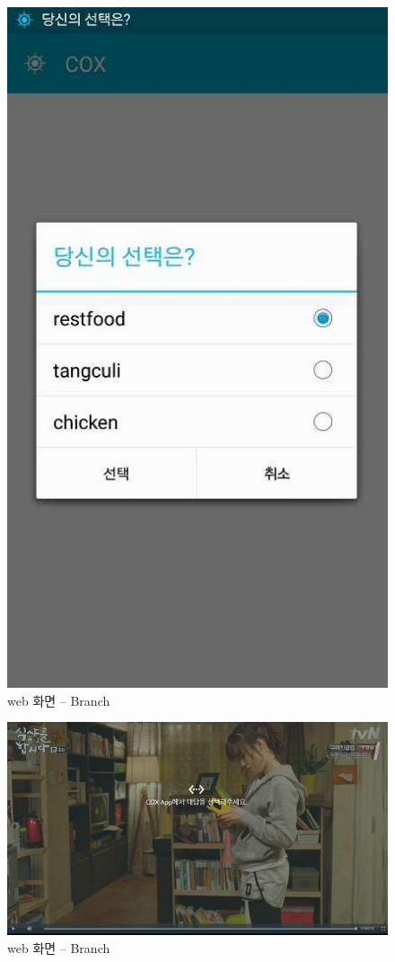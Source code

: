 \documentclass[chapter,oneside]{oblivoir}
\begin{document}
\begin{enumerate}
\begin{enumerate}
        \begin{figure}[h!]
            \centering
        \includegraphics{pic/chp78/img1081}
            \caption{web 화면 – Branch}
        \end{figure} 

        \begin{figure}[h!]
            \centering
        \includegraphics{pic/chp78/img1082}
            \caption{web 화면 – Branch}
        \end{figure} 


\end{enumerate}
\end{enumerate}
\end{document}
